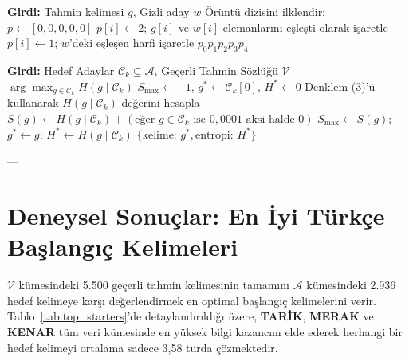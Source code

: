 \documentclass[11pt,a4paper]{article}
\begin{document}
\begin{algorithm}[H]
\caption{Geri Bildirim Örüntü Eşleştiricisi $f(g, w)$}
\begin{algorithmic}[1]
\State \textbf{Girdi:} Tahmin kelimesi $g$, Gizli aday $w$
\State Örüntü dizisini ilklendir: $p \gets [0, 0, 0, 0, 0]$
\State {}
        \State $p[i] \gets 2$; $g[i]$ ve $w[i]$ elemanlarını eşleşti olarak işaretle
    \EndIf
\EndFor
\State {}
        \State $p[i] \gets 1$; $w$'deki eşleşen harfi işaretle
    \EndIf
\EndFor
\State \Return $p_0 p_1 p_2 p_3 p_4$
\end{algorithmic}
\end{algorithm}

\begin{algorithm}[H]
\caption{En Optimal Kelimeyi Bulucu $\text{findBestWord}(\mathcal{C}_k, \mathcal{V})$}
\begin{algorithmic}[1]
\State \textbf{Girdi:} Hedef Adaylar $\mathcal{C}_k \subseteq \mathcal{A}$, Geçerli Tahmin Sözlüğü $\mathcal{V}$
    \State \Return $\arg\max_{g \in \mathcal{C}_k} H(g \mid \mathcal{C}_k)$
\EndIf
\State $S_{\max} \gets -1$, $g^* \gets \mathcal{C}_k[0]$, $H^* \gets 0$
    \State Denklem (3)'ü kullanarak $H(g \mid \mathcal{C}_k)$ değerini hesapla
    \State $S(g) \gets H(g \mid \mathcal{C}_k) + (\text{eğer } g \in \mathcal{C}_k \text{ ise } 0,0001 \text{ aksi halde } 0)$
        \State $S_{\max} \gets S(g)$; $g^* \gets g$; $H^* \gets H(g \mid \mathcal{C}_k)$
    \EndIf
\EndFor
\State \Return $\{ \text{kelime: } g^*, \text{entropi: } H^* \}$
\end{algorithmic}
\end{algorithm}

---

\section{Deneysel Sonuçlar: En İyi Türkçe Başlangıç Kelimeleri}

$\mathcal{V}$ kümesindeki 5.500 geçerli tahmin kelimesinin tamamını $\mathcal{A}$ kümesindeki 2.936 hedef kelimeye karşı değerlendirmek en optimal başlangıç kelimelerini verir. Tablo~\ref{tab:top_starters}'de detaylandırıldığı üzere, \textbf{TARİK}, \textbf{MERAK} ve \textbf{KENAR} tüm veri kümesinde en yüksek bilgi kazancını elde ederek herhangi bir hedef kelimeyi ortalama sadece 3,58 turda çözmektedir.
\end{document}

